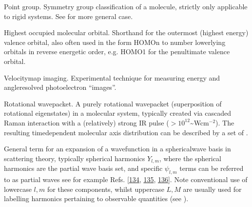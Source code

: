 \documentclass[letterpaper,table,10pt,english]{jupyterBook}
\begin{document}
\begin{description}
\sphinxAtStartPar
Point group. Symmetry group classification of a molecule, strictly only applicable to rigid systems. See {\hyperref[\detokenize{backmatter/glossary:term-MS}]{}} for more general case.

\sphinxAtStartPar
Highest occupied molecular orbital. Short\sphinxhyphen{}hand for the outermost (highest energy) valence orbital, also often used in the form HOMO\sphinxhyphen{}n to number lower\sphinxhyphen{}lying orbitals in reverse energetic order, e.g. HOMO\sphinxhyphen{}1 for the penultimate valence orbital.

\sphinxAtStartPar
Velocity\sphinxhyphen{}map imaging. Experimental technique for measuring energy and angle\sphinxhyphen{}resolved photoelectron “images”.

\sphinxAtStartPar
Rotational wavepacket. A purely rotational wavepacket (superposition of rotational eigenstates) in a molecular system, typically created via cascaded Raman interaction with a (relatively) strong IR pulse (\(>10^{12}\)\textasciitilde{}Wcm\(^{-2}\)). The resulting time\sphinxhyphen{}dependent molecular axis distribution can be described by a set of {\hyperref[\detokenize{backmatter/glossary:term-ADMs}]{}}.

\sphinxAtStartPar
General term for an expansion of a wavefunction in a spherical\sphinxhyphen{}wave basis in scattering theory, typically spherical harmonics \(Y_{l,m}\), where the spherical harmonics are the partial wave basis set, and specific \(\psi_{l,m}\) terms can be referred to as partial waves \sphinxhyphen{} see for example Refs. {[}\hyperlink{cite.backmatter/bibliography:id723}{134}, \hyperlink{cite.backmatter/bibliography:id771}{135}, \hyperlink{cite.backmatter/bibliography:id848}{136}{]}. Note conventional use of lower\sphinxhyphen{}case \(l,m\) for these components, whilst upper\sphinxhyphen{}case \(L,M\) are usually used for labelling harmonics pertaining to observable quantities (see {\hyperref[\detokenize{backmatter/glossary:term-anisotropy-paramters}]{}}).


\end{description}
\end{document}
